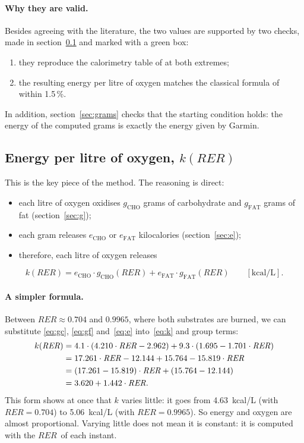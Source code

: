 \documentclass[10pt,a4paper]{article}
\newcommand{\sub}[1]{{\scriptscriptstyle\mathrm{#1}}}   %
\newcommand{\CHO}{\sub{CHO}}
\newcommand{\FAT}{\sub{FAT}}
\newcommand{\RER}{\ensuremath{\mathit{RER}}}
\newcommand{\kcal}{\ensuremath{\mathrm{kcal}}}
\begin{document}
\paragraph{Why they are valid.} Besides agreeing with the literature, the two values are
supported by two checks, made in section~\ref{sec:k} and marked with a green box:
\begin{enumerate}[label=(\alph*)]
  \item they reproduce the calorimetry table of \citet{peronnet1991} at both extremes;
  \item the resulting energy per litre of oxygen matches the classical formula of
        \citet{weir1949} within 1.5\,\%.
\end{enumerate}
In addition, section~\ref{sec:grams} checks that the starting condition holds: the energy
of the computed grams is exactly the energy given by Garmin.

\subsection{Energy per litre of oxygen, \texorpdfstring{$k(\mathit{RER})$}{k(RER)}}\label{sec:k}
This is the key piece of the method. The reasoning is direct:
\begin{itemize}
  \item each litre of oxygen oxidises $g_{\CHO}$ grams of carbohydrate and $g_{\FAT}$ grams
        of fat (section~\ref{sec:g});
  \item each gram releases $e_{\CHO}$ or $e_{\FAT}$ kilocalories (section~\ref{sec:e});
  \item therefore, each litre of oxygen releases
\end{itemize}
\begin{equation}
  k(\RER)=e_{\CHO}\cdot g_{\CHO}(\RER)+e_{\FAT}\cdot g_{\FAT}(\RER)\qquad[\kcal/\mathrm{L}].
  \label{eq:k}
\end{equation}

\paragraph{A simpler formula.} Between $\RER\approx0.704$ and $0.9965$, where both
substrates are burned, we can substitute \eqref{eq:gc}, \eqref{eq:gf} and~\eqref{eq:e}
into~\eqref{eq:k} and group terms:
\begin{align}
  k(\RER) &= 4.1\cdot(4.210\cdot\RER-2.962)+9.3\cdot(1.695-1.701\cdot\RER) \notag\\
          &= 17.261\cdot\RER-12.144+15.764-15.819\cdot\RER \notag\\
          &= (17.261-15.819)\cdot\RER+(15.764-12.144) \notag\\
          &= 3.620+1.442\cdot\RER . \label{eq:klin}
\end{align}
This form shows at once that $k$ varies little: it goes from 4.63~kcal/L (with
$\RER=0.704$) to 5.06~kcal/L (with $\RER=0.9965$). So energy and oxygen are almost
proportional. Varying little does not mean it is constant: it is computed with the \RER\ of
each instant.
\end{document}
